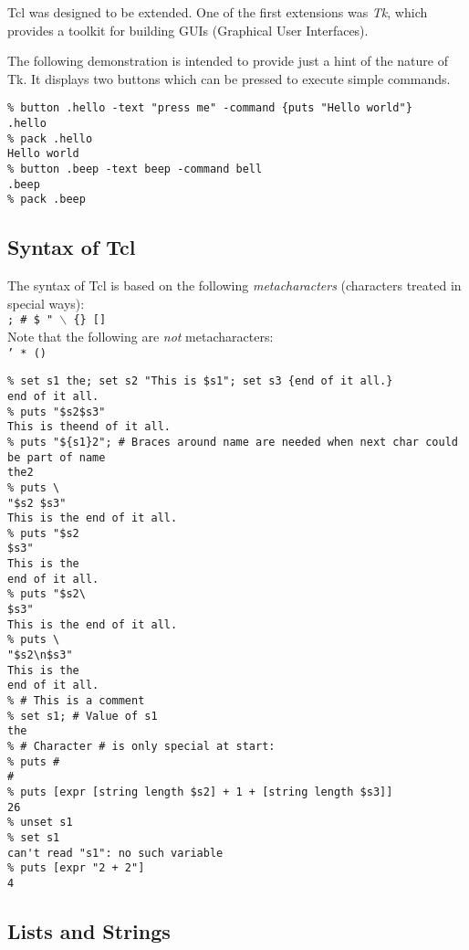 Tcl was designed to be extended. One of the first extensions was
  \emph{Tk}, which provides a toolkit for building GUIs (Graphical
  User Interfaces).
  

The following demonstration is intended to provide just a hint of
  the nature of Tk. It displays two buttons which can be pressed to
  execute simple commands.
  \begin{verbatim}
% button .hello -text "press me" -command {puts "Hello world"}
.hello
% pack .hello
Hello world
% button .beep -text beep -command bell
.beep
% pack .beep
\end{verbatim}

\subsection{Syntax of Tcl}
    \label{tcl-log-syntax}

The syntax of Tcl is based on the following 
  \emph{metacharacters} (characters treated in special ways):
  \\
  \texttt{; \# \$ " $\backslash$ \{\} []}
  \\Note that the following are 
  \emph{not} metacharacters:
  \\
  \texttt{' * ()}
  \begin{verbatim}
% set s1 the; set s2 "This is $s1"; set s3 {end of it all.}
end of it all.
% puts "$s2$s3"
This is theend of it all.
% puts "${s1}2"; # Braces around name are needed when next char could be part of name
the2
% puts \
"$s2 $s3"
This is the end of it all.
% puts "$s2
$s3"
This is the
end of it all.
% puts "$s2\
$s3"
This is the end of it all.
% puts \
"$s2\n$s3"
This is the
end of it all.
% # This is a comment
% set s1; # Value of s1
the
% # Character # is only special at start:
% puts #
#
% puts [expr [string length $s2] + 1 + [string length $s3]]
26
% unset s1
% set s1
can't read "s1": no such variable
% puts [expr "2 + 2"]
4
\end{verbatim}

\subsection{Lists and Strings}
    \label{tcl-log-lists-strings}

